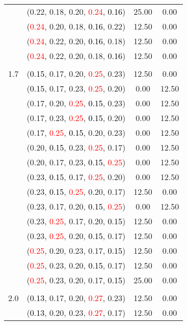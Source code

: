 \documentclass[10pt,a4paper]{report}
\begin{document}
\begin{center}
\begin{longtable}{clcc}
			&(0.22, 0.18, 0.20, \textcolor{red}{0.24}, \textcolor{black}{0.16})&25.00&0.00\\
			&(\textcolor{red}{0.24}, 0.20, 0.18, \textcolor{black}{0.16}, 0.22)&12.50&0.00\\
			&(\textcolor{red}{0.24}, 0.22, 0.20, \textcolor{black}{0.16}, 0.18)&12.50&0.00\\
			&(\textcolor{red}{0.24}, 0.22, 0.20, 0.18, \textcolor{black}{0.16})&12.50&0.00\\
		&&&\\
		1.7			&(\textcolor{black}{0.15}, 0.17, 0.20, \textcolor{red}{0.25}, 0.23)&12.50&0.00\\
			&(\textcolor{black}{0.15}, 0.17, 0.23, \textcolor{red}{0.25}, 0.20)&0.00&12.50\\
			&(0.17, 0.20, \textcolor{red}{0.25}, \textcolor{black}{0.15}, 0.23)&0.00&12.50\\
			&(0.17, 0.23, \textcolor{red}{0.25}, \textcolor{black}{0.15}, 0.20)&0.00&12.50\\
			&(0.17, \textcolor{red}{0.25}, \textcolor{black}{0.15}, 0.20, 0.23)&0.00&12.50\\
			&(0.20, \textcolor{black}{0.15}, 0.23, \textcolor{red}{0.25}, 0.17)&0.00&12.50\\
			&(0.20, 0.17, 0.23, \textcolor{black}{0.15}, \textcolor{red}{0.25})&0.00&12.50\\
			&(0.23, \textcolor{black}{0.15}, 0.17, \textcolor{red}{0.25}, 0.20)&0.00&12.50\\
			&(0.23, \textcolor{black}{0.15}, \textcolor{red}{0.25}, 0.20, 0.17)&12.50&0.00\\
			&(0.23, 0.17, 0.20, \textcolor{black}{0.15}, \textcolor{red}{0.25})&0.00&12.50\\
			&(0.23, \textcolor{red}{0.25}, 0.17, 0.20, \textcolor{black}{0.15})&12.50&0.00\\
			&(0.23, \textcolor{red}{0.25}, 0.20, \textcolor{black}{0.15}, 0.17)&12.50&0.00\\
			&(\textcolor{red}{0.25}, 0.20, 0.23, 0.17, \textcolor{black}{0.15})&12.50&0.00\\
			&(\textcolor{red}{0.25}, 0.23, 0.20, \textcolor{black}{0.15}, 0.17)&12.50&0.00\\
			&(\textcolor{red}{0.25}, 0.23, 0.20, 0.17, \textcolor{black}{0.15})&25.00&0.00\\
		&&&\\
		2.0			&(\textcolor{black}{0.13}, 0.17, 0.20, \textcolor{red}{0.27}, 0.23)&12.50&0.00\\
			&(\textcolor{black}{0.13}, 0.20, 0.23, \textcolor{red}{0.27}, 0.17)&12.50&0.00\\

\end{longtable}
\end{center}
\end{document}
